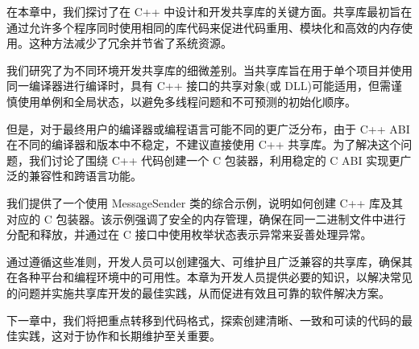 在本章中，我们探讨了在 C++ 中设计和开发共享库的关键方面。共享库最初旨在通过允许多个程序同时使用相同的库代码来促进代码重用、模块化和高效的内存使用。这种方法减少了冗余并节省了系统资源。

我们研究了为不同环境开发共享库的细微差别。当共享库旨在用于单个项目并使用同一编译器进行编译时，具有 C++ 接口的共享对象(或 DLL)可能适用，但需谨慎使用单例和全局状态，以避免多线程问题和不可预测的初始化顺序。

但是，对于最终用户的编译器或编程语言可能不同的更广泛分布，由于 C++ ABI 在不同的编译器和版本中不稳定，不建议直接使用 C++ 共享库。为了解决这个问题，我们讨论了围绕 C++ 代码创建一个 C 包装器，利用稳定的 C ABI 实现更广泛的兼容性和跨语言功能。

我们提供了一个使用 MessageSender 类的综合示例，说明如何创建 C++ 库及其对应的 C 包装器。该示例强调了安全的内存管理，确保在同一二进制文件中进行分配和释放，并通过在 C 接口中使用枚举状态表示异常来妥善处理异常。

通过遵循这些准则，开发人员可以创建强大、可维护且广泛兼容的共享库，确保其在各种平台和编程环境中的可用性。本章为开发人员提供必要的知识，以解决常见的问题并实施共享库开发的最佳实践，从而促进有效且可靠的软件解决方案。

下一章中，我们将把重点转移到代码格式，探索创建清晰、一致和可读的代码的最佳实践，这对于协作和长期维护至关重要。
